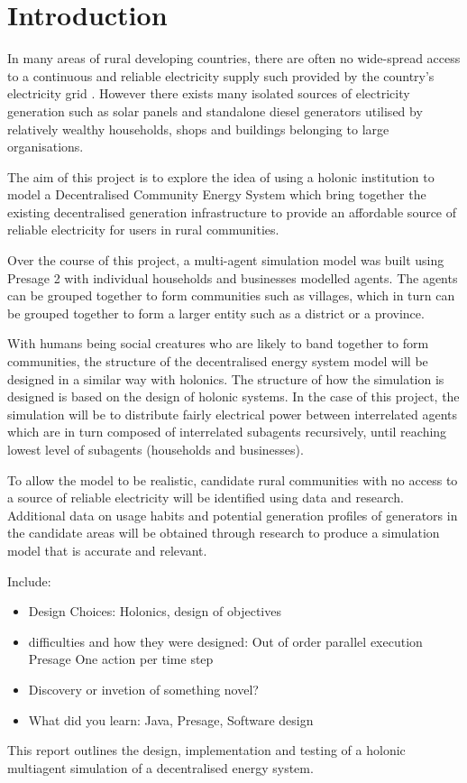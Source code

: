 \chapter{Introduction}
\label{introduction}

In many areas of rural developing countries, there are often no wide-spread access to a continuous and reliable electricity supply such provided by the country's electricity grid \cite{IEA-web:2015}. However there exists many isolated sources of electricity generation such as solar panels and standalone diesel generators utilised by relatively wealthy households, shops and buildings belonging to large organisations. 

The aim of this project is to explore the idea of using a holonic institution to model a Decentralised Community Energy System which bring together the existing decentralised generation infrastructure to provide an affordable source of reliable electricity for users in rural communities. 

Over the course of this project, a multi-agent simulation model was built using Presage 2 with individual households and businesses modelled agents. The agents can be grouped together to form communities such as villages, which in turn can be grouped together to form a larger entity such as a district or a province. 

With humans being social creatures who are likely to band together to form communities, the structure of the decentralised energy system model will be designed in a similar way with holonics. The structure of how the simulation is designed is based on the design of holonic systems. In the case of this project, the simulation will be to distribute fairly electrical power between interrelated agents which are in turn composed of interrelated subagents recursively, until reaching lowest level of subagents (households and businesses). 

To allow the model to be realistic, candidate rural communities with no access to a source of reliable electricity will be identified using data and research. Additional data on usage habits and potential generation profiles of generators in the candidate areas will be obtained through research to produce a simulation model that is accurate and relevant.

Include:
\begin{itemize}
\item Design Choices: Holonics, design of objectives
\item difficulties and how they were designed:
\subitem Out of order parallel execution
\subitem Presage
\subitem One action per time step
\item Discovery or invetion of something novel?
\item What did you learn:
\subitem Java, Presage, Software design
\end{itemize}


This report outlines the design, implementation and testing of a holonic multiagent simulation of a decentralised energy system. 
